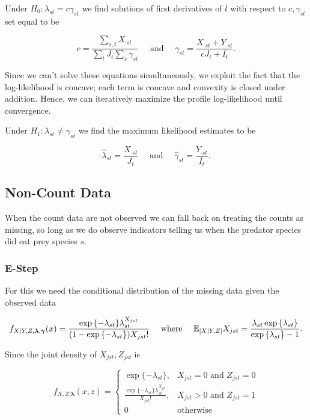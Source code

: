 \documentclass[12pt]{article}\usepackage[]{graphicx}\usepackage[]{color}
\begin{document}
Under $H_0: \lambda_{st} = c \gamma_{st}$ we find solutions of first derivatives of $l$ with respect to $c, \gamma_{st}$ set equal to be

\begin{equation*}
  c = \frac{\sum_{s,t} X_{\cdot st}}{\sum_{t} J_t \sum_{s} \gamma_{st}} \quad \text{ and } \quad \gamma_{st} = \frac{X_{\cdot st} + Y_{\cdot st}}{cJ_{t} + I_{t}}.
\end{equation*}

\noindent Since we can't solve these equations simultaneously, we exploit the fact that the log-likelihood is concave; each term is concave and convexity is closed under addition.  Hence, we can iteratively maximize the profile log-likelihood until convergence.  

Under $H_1: \lambda_{st} \ne \gamma_{st}$ we find the maximum likelihood estimates to be

\begin{equation*}
  \hat{\lambda}_{st} = \frac{X_{\cdot st}}{J_{t}} \quad \text{ and } \quad \hat{\gamma}_{st} = \frac{Y_{\cdot st}}{I_{t}}.
\end{equation*}

\subsection{Non-Count Data}

When the count data are not observed we can fall back on treating the counts as missing, so long as we do observe indicators telling us when the predator species did eat prey species $s$.  

\subsubsection*{E-Step}
For this we need the conditional distribution of the missing data given the observed data

\begin{equation*}
  f_{X|Y,Z,\boldsymbol{\lambda},\boldsymbol{\gamma}}(x) = \frac{\exp{\{-\lambda_{st}\}} \lambda_{st}^{X_{jst}}}{(1 - \exp{\{-\lambda_{st}\}}) X_{jst}!} \quad \text{ where } \quad \mathbb{E}_{[X|Y,Z]}X_{jst} = \frac{\lambda_{st} \exp{\{\lambda_{st} \}}}{\exp{\{ \lambda_{st} \}} - 1}.
\end{equation*}

Since the joint density of $X_{jst}, Z_{jst}$ is

\begin{equation*}
  f_{X,Z|\boldsymbol{\lambda}}(x,z) = \left\{
    \begin{array}{lr}
      \exp{\{ -\lambda_{st} \}}, & X_{jst}=0 \mbox{ and } Z_{jst} = 0 \\
      \frac{\exp{\{-\lambda_{st} \}} \lambda_{st}^{X_{jst}}}{X_{jst}!}, & X_{jst} > 0 \mbox{ and } Z_{jst} = 1\\
      0 & \mbox{otherwise}
    \end{array}
  \right.
\end{equation*}
\end{document}
